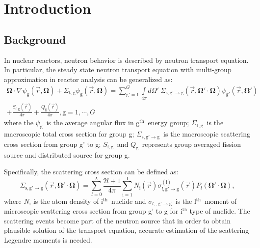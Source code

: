 \documentclass[review]{elsarticle}
\newcommand{\psig}{\psi_\mathrm{g}(\vec{r},\mathbf{\Omega})}
\begin{document}
\linenumbers

\section{Introduction}
\subsection{Background}
In nuclear reactors, neutron behavior is described by neutron transport equation. In particular, the steady state neutron transport equation with multi-group approximation in reactor analysis can be generalized as\cite{handbooktransportequation}:
\begin{align}
\mathbf{\Omega}\cdot\nabla\psi_\mathrm{g}(\vec{r},\mathbf{\Omega})+\Sigma_\mathrm{t,g}\psig=\sum\limits_{\mathrm{g'}=1}^{G}\int\limits_{4\pi}d\Omega'\ \Sigma_\mathrm{s,g'\to g}(\vec{r},\mathbf{\Omega'\cdot\Omega})\psi_\mathrm{g'}(\vec{r},\mathbf{\Omega'})\\
+\frac{S_\mathrm{f,g}(\vec{r})}{4\pi}+\frac{Q_\mathrm{g}(\vec{r})}{4\pi},\mathrm{g}=1,\cdots,G\nonumber
\end{align} 
where the $\psi_\mathrm{g}$\ is the average angular flux in $\mathrm{g^{th}}$\ energy group; $\Sigma_\mathrm{t,g}$\ is the macroscopic total cross section for group g; $\Sigma_\mathrm{s,g'\to g}$\ is the macroscopic scattering cross section from group g' to g; $S_\mathrm{f,g}$\ and $Q_\mathrm{g}$\ represents group averaged fission source and distributed source for group g.

Specifically, the scattering cross section can be defined as:
\begin{equation}
\Sigma_\mathrm{s,g'\to g}(\vec{r},\mathbf{\Omega'\cdot\Omega})=\sum\limits_{l=0}^{L}\frac{2l+1}{4\pi}\sum\limits_{\mathrm{i=1}}^{\mathrm{I}}N_\mathrm{i}(\vec{r})\sigma_{l\mathrm{,g'\to g}}^{\mathrm{(i)}}(\vec{r})P_l(\mathbf{\Omega'\cdot\Omega}),
\end{equation}
where $N_\mathrm{i}$ is the atom density of i$^{\mathrm{th}}$\ nuclide and $\sigma_{l,\mathrm{,g'\to g}}$\ is the l$^{\mathrm{th}}$\ moment of microscopic scattering cross section from group g' to g for i$^{\mathrm{th}}$ type of nuclide. The scattering events become part of the neutron source that in order to obtain plausible solution of the transport equation, accurate estimation of the scattering Legendre moments is needed.
\end{document}
